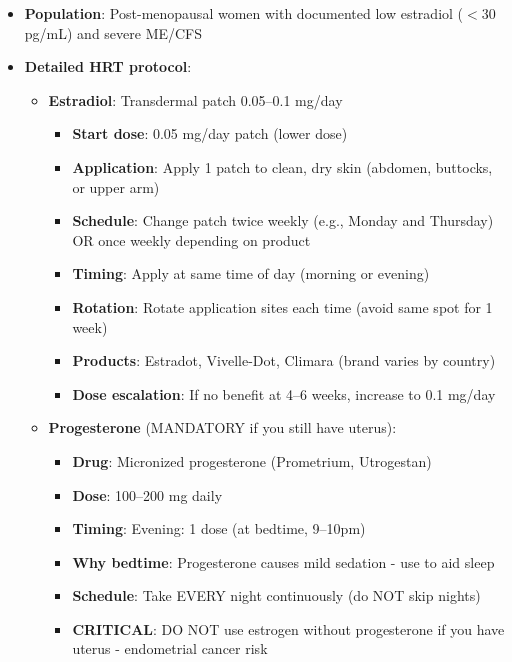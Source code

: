 \begin{itemize}
    \item \textbf{Population}: Post-menopausal women with documented low estradiol ($<$30 pg/mL) and severe ME/CFS

    \item \textbf{Detailed HRT protocol}:
    \begin{itemize}
        \item \textbf{Estradiol}: Transdermal patch 0.05--0.1 mg/day
        \begin{itemize}
            \item \textbf{Start dose}: 0.05 mg/day patch (lower dose)
            \item \textbf{Application}: Apply 1 patch to clean, dry skin (abdomen, buttocks, or upper arm)
            \item \textbf{Schedule}: Change patch twice weekly (e.g., Monday and Thursday) OR once weekly depending on product
            \item \textbf{Timing}: Apply at same time of day (morning or evening)
            \item \textbf{Rotation}: Rotate application sites each time (avoid same spot for 1 week)
            \item \textbf{Products}: Estradot, Vivelle-Dot, Climara (brand varies by country)
            \item \textbf{Dose escalation}: If no benefit at 4--6 weeks, increase to 0.1 mg/day
        \end{itemize}

        \item \textbf{Progesterone} (MANDATORY if you still have uterus):
        \begin{itemize}
            \item \textbf{Drug}: Micronized progesterone (Prometrium, Utrogestan)
            \item \textbf{Dose}: 100--200 mg daily
            \item \textbf{Timing}: Evening: 1 dose (at bedtime, 9--10pm)
            \item \textbf{Why bedtime}: Progesterone causes mild sedation - use to aid sleep
            \item \textbf{Schedule}: Take EVERY night continuously (do NOT skip nights)
            \item \textbf{CRITICAL}: DO NOT use estrogen without progesterone if you have uterus - endometrial cancer risk
        \end{itemize}


\end{itemize}
\end{itemize}
